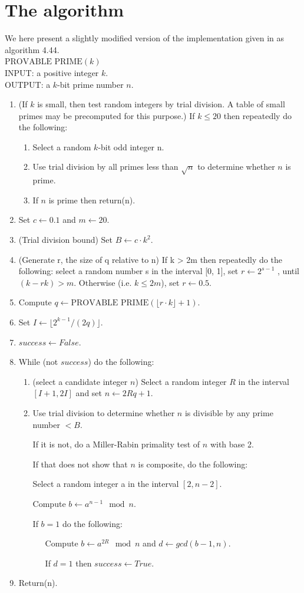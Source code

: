 \documentclass[11pt,a4paper]{article}
\begin{document}
\section{The algorithm}
We here present a slightly modified version of the implementation
given in \cite{Menezes:1997:HAC} as algorithm 4.44.\\

\noindent
$\text{PROVABLE PRIME}(k)$\\
INPUT: a positive integer $k$.\\
OUTPUT: a $k$-bit prime number $n$.
\begin{enumerate}
\item (If $k$ is small, then test random integers by trial division. A table of small primes may 
be precomputed for this purpose.) 
If $k \leq 20$ then repeatedly do the following: 
\begin{enumerate}
\item Select a random $k$-bit odd integer n. 
\item Use trial division by all primes less than $\sqrt{n}$ to determine whether $n$ is prime. 
\item If $n$ is prime then return(n).
\end{enumerate}
\item Set $c\leftarrow 0.1$ and $m\leftarrow 20$. 
\item (Trial division bound) Set $B\leftarrow c \cdot k^2$. 
\item (Generate r, the size of q relative to n) If k > 2m then repeatedly 
do the following: select a random number s in the interval [0, 1], set $r\leftarrow 2^{s-1}$ , until 
$(k - rk) > m$. Otherwise (i.e. $k \leq 2m$), set $r\leftarrow 0.5$. 
\item Compute $q\leftarrow \text{PROVABLE PRIME}(\lfloor r \cdot k \rfloor + 1)$. 
\item Set $I \leftarrow \lfloor 2^{k-1} /(2q) \rfloor$. 
\item $success\leftarrow False$. 
\item While (not $success$) do the following:
  \begin{enumerate}
\item (select a candidate integer $n$) Select a random integer $R$ in the interval 
$[I + 1, 2I]$ and set $n\leftarrow 2Rq + 1$. 
\item Use trial division to determine whether $n$ is divisible by any prime number $< B$.

If it is not, do a Miller-Rabin primality test of $n$ with base 2.

If that does not show that $n$ is composite, do the following: 

Select a random integer a in the interval $[2, n - 2]$. 

Compute $b\leftarrow a^{n-1} \mod n$. 

If $b = 1$ do the following: 

\ \ \ Compute $b\leftarrow a^{2R} \mod n$ and $d\leftarrow  gcd(b - 1, n)$.

\ \ \ If $d = 1$ then $success\leftarrow True$.
\end{enumerate} 
\item Return(n). 
\end{enumerate}
\end{document}
